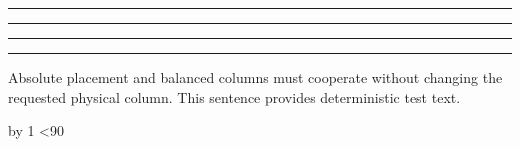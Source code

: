 \documentclass[twocolumn]{article}
\newcommand{\filler}{%
  Absolute placement and balanced columns must cooperate without changing the
  requested physical column. This sentence provides deterministic test text.\par
}
\begin{document}
\balance

\begin{abstable}[page=2,pos=t,col=1]
  \centering
  \caption{BALANCE TOP LEFT}
  \rule{0.8\columnwidth}{12mm}
\end{abstable}

\begin{abstable}[page=2,pos=t,col=2]
  \centering
  \caption{BALANCE TOP RIGHT}
  \rule{0.8\columnwidth}{12mm}
\end{abstable}

\begin{abstable}[page=2,pos=b,col=1]
  \centering
  \caption{BALANCE BOTTOM LEFT}
  \rule{0.8\columnwidth}{10mm}
\end{abstable}

\begin{abstable}[page=2,pos=b,col=2]
  \centering
  \caption{BALANCE BOTTOM RIGHT}
  \rule{0.8\columnwidth}{10mm}
\end{abstable}

\newcount\fillercount
{}
\loop
  \filler
  \advance\fillercount by 1
\ifnum\fillercount<90
\repeat
\end{document}
